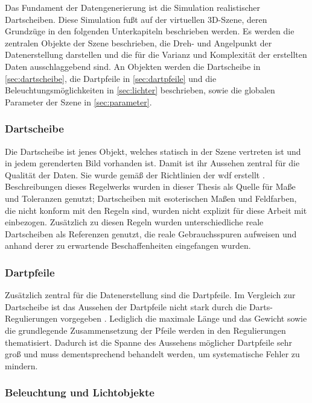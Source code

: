 Das Fundament der Datengenerierung ist die Simulation realistischer Dartscheiben. Diese Simulation fußt auf der virtuellen 3D-Szene, deren Grundzüge in den folgenden Unterkapiteln beschrieben werden. Es werden die zentralen Objekte der Szene beschrieben, die Dreh- und Angelpunkt der Datenerstellung darstellen und die für die Varianz und Komplexität der erstellten Daten ausschlaggebend sind. An Objekten werden die Dartscheibe in \autoref{sec:dartscheibe}, die Dartpfeile in \autoref{sec:dartpfeile} und die Beleuchtungsmöglichkeiten in \autoref{sec:lichter} beschrieben, sowie die globalen Parameter der Szene in \autoref{sec:parameter}.

\subsubsection{Dartscheibe}
\label{sec:dartscheibe}

Die Dartscheibe ist jenes Objekt, welches statisch in der Szene vertreten ist und in jedem gerenderten Bild vorhanden ist. Damit ist ihr Aussehen zentral für die Qualität der Daten. Sie wurde gemäß der Richtlinien  der \ac{wdf} erstellt \cite{wdf-rules}. Beschreibungen dieses Regelwerks wurden in dieser Thesis als Quelle für Maße und Toleranzen genutzt; Dartscheiben mit esoterischen Maßen und Feldfarben, die nicht konform mit den Regeln sind, wurden nicht explizit für diese Arbeit mit einbezogen. Zusätzlich zu diesen Regeln wurden unterschiedliche reale Dartscheiben als Referenzen genutzt, die reale Gebrauchsspuren aufweisen und anhand derer zu erwartende Beschaffenheiten eingefangen wurden.

\subsubsection{Dartpfeile}
\label{sec:dartpfeile}

Zusätzlich zentral für die Datenerstellung sind die Dartpfeile. Im Vergleich zur Dartscheibe ist das Aussehen der Dartpfeile nicht stark durch die Darts-Regulierungen vorgegeben \cite{wdf-rules,pdc_rules}. Lediglich die maximale Länge und das Gewicht sowie die grundlegende Zusammensetzung der Pfeile werden in den Regulierungen thematisiert. Dadurch ist die Spanne des Aussehens möglicher Dartpfeile sehr groß und muss dementsprechend behandelt werden, um systematische Fehler zu mindern.

\subsubsection{Beleuchtung und Lichtobjekte}
\label{sec:lichtobjekte}


